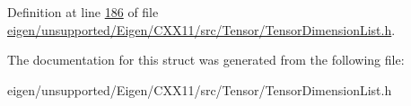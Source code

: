 Definition at line \hyperlink{eigen_2unsupported_2_eigen_2_c_x_x11_2src_2_tensor_2_tensor_dimension_list_8h_source_l00186}{186} of file \hyperlink{eigen_2unsupported_2_eigen_2_c_x_x11_2src_2_tensor_2_tensor_dimension_list_8h_source}{eigen/unsupported/\+Eigen/\+C\+X\+X11/src/\+Tensor/\+Tensor\+Dimension\+List.\+h}.



The documentation for this struct was generated from the following file\+:\begin{DoxyCompactItemize}
\item 
eigen/unsupported/\+Eigen/\+C\+X\+X11/src/\+Tensor/\+Tensor\+Dimension\+List.\+h\end{DoxyCompactItemize}
